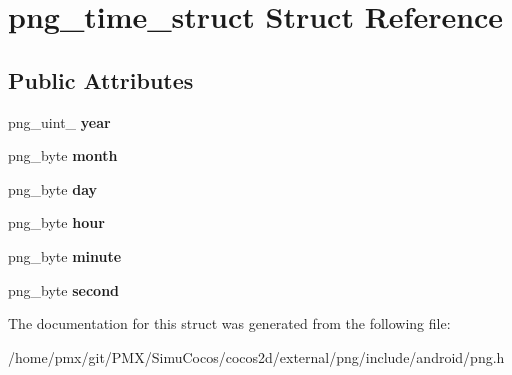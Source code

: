 \hypertarget{structpng__time__struct}{}\section{png\+\_\+time\+\_\+struct Struct Reference}
\label{structpng__time__struct}
\subsection*{Public Attributes}
\begin{DoxyCompactItemize}
\item 
\mbox{\label{structpng__time__struct_a5cceb6213fc7b4462435ea1d8fc1c798}} 
png\+\_\+uint\+\_ {\bfseries year}
\item 
\mbox{\label{structpng__time__struct_a3ab550977ee2cb1165c0398131f2e601}} 
png\+\_\+byte {\bfseries month}
\item 
\mbox{\label{structpng__time__struct_afa0f94516a676178d1dabeb96eccdcdb}} 
png\+\_\+byte {\bfseries day}
\item 
\mbox{\label{structpng__time__struct_a79ac8b217254fd87cdc7299e6612a6f4}} 
png\+\_\+byte {\bfseries hour}
\item 
\mbox{\label{structpng__time__struct_ad3ce11e9d92b77a33b3f7480bf0fff8c}} 
png\+\_\+byte {\bfseries minute}
\item 
\mbox{\label{structpng__time__struct_a84e528e4c4c7d76cd2252e0d0d2ed0c9}} 
png\+\_\+byte {\bfseries second}
\end{DoxyCompactItemize}


The documentation for this struct was generated from the following file\+:\begin{DoxyCompactItemize}
\item 
/home/pmx/git/\+P\+M\+X/\+Simu\+Cocos/cocos2d/external/png/include/android/png.\+h\end{DoxyCompactItemize}
